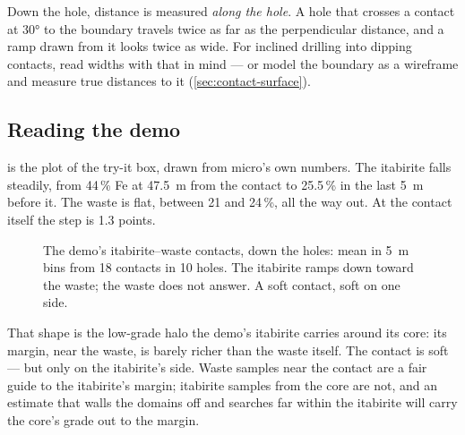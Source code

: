 \begin{caution}
Down the hole, distance is measured \emph{along the hole}. A hole that crosses a contact at 30° to the boundary travels twice as far as the perpendicular distance, and a ramp drawn from it looks twice as wide. For inclined drilling into dipping contacts, read widths with that in mind — or model the boundary as a wireframe and measure true distances to it (\cref{sec:contact-surface}).
\end{caution}

\subsection{Reading the demo}
 is the plot of the try-it box, drawn from micro's own numbers. The itabirite falls steadily, from 44\,\% Fe at 47.5~m from the contact to 25.5\,\% in the last 5~m before it. The waste is flat, between 21 and 24\,\%, all the way out. At the contact itself the step is 1.3 points.

\begin{figure}[htbp]\centering
{}
\caption{The demo's itabirite–waste contacts, down the holes: mean  in 5~m bins from 18 contacts in 10 holes. The itabirite ramps down toward the waste; the waste does not answer. A soft contact, soft on one side.}\label{fig:contact-itab}
\end{figure}

That shape is the low-grade halo the demo's itabirite carries around its core: its margin, near the waste, is barely richer than the waste itself. The contact is soft — but only on the itabirite's side. Waste samples near the contact are a fair guide to the itabirite's margin; itabirite samples from the core are not, and an estimate that walls the domains off and searches far within the itabirite will carry the core's grade out to the margin.

